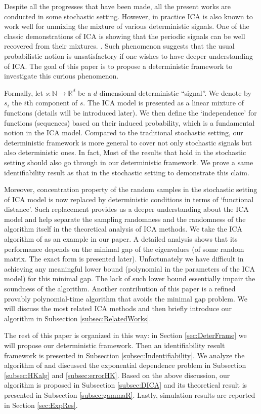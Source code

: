 \documentclass[twoside]{article}
\newcommand{\ra}{\rightarrow}
\newcommand{\real}{\mathbb{R}}
\renewcommand{\natural}{\mathbb{N}}
\theoremstyle{definition}
\begin{document}
Despite all the progresses that have been made, all the present works are conducted in some stochastic setting.
However, in practice ICA is also known to work well for unmixing the mixture of various deterministic signals. 
One of the classic demonstrations of ICA is showing that the periodic signals can be well recovered from their mixtures. \citep{HyvOja00}.
Such phenomenon suggests that the usual probabilistic notion is unsatisfactory if one wishes to have deeper understanding of ICA.   
The goal of this paper is to propose a deterministic framework to investigate this curious phenomenon. 

Formally, let $s:\natural \ra \real^d$ be a $d$-dimensional deterministic ``signal''. We denote by $s_i$ the $i$th component of $s$.
The ICA model is presented as a linear mixture of functions (details will be introduced later).
We then define the `independence' for functions (sequences) based on their induced probability, which is a fundamental notion in the ICA model.
Compared to the traditional stochastic setting, our deterministic framework is more general to cover not only stochastic signals but also deterministic ones. 
In fact, Most of the results that hold in the stochastic setting should also go through in our deterministic framework.
We prove a same identifiability result as that in the stochastic setting to demonstrate this claim.

Moreover, concentration property of the random samples in the stochastic setting of ICA model is now replaced by deterministic conditions in terms of `functional distance'.
Such replacement provides us a deeper understanding about the ICA model and help separate the sampling randomness and the randomness of the algorithm itself in the theoretical analysis of ICA methods.
We take the ICA algorithm of \citep{hsu2013learning} as an example in our paper.
A detailed analysis shows that its performance depends on the minimal gap of the eigenvalues (of some random matrix. The exact form is presented later).
Unfortunately we have difficult in achieving any meaningful lower bound (polynomial in the parameters of the ICA model) for this minimal gap.
The lack of such lower bound essentially impair the soundness of the algorithm. 
Another contribution of this paper is a refined provably polynomial-time algorithm that avoids the minimal gap problem. 
We will discuss the most related ICA methods and then briefly introduce our algorithm in Subsection \ref{subsec:RelatedWorks}.

The rest of this paper is organized in this way: 
in Section \ref{sec:DeterFrame} we will propose our deterministic framework. 
Then an identifiability result framework is presented in Subsection \ref{subsec:Indentifiability}.
We analyze the algorithm of \cite{hsu2013learning} and discussed the exponential dependence problem in Subsection \ref{subsec:HKalg} and \ref{subsec:errorHK}. 
Based on the above discussion, our algorithm is proposed in Subsection \ref{subsec:DICA} and its theoretical result is presented in Subsection \ref{subsec:gammaR}.
Lastly, simulation results are reported in Section \ref{sec:ExpRes}.
\end{document}
